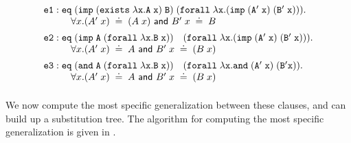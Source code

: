 \documentclass{llncs}
\newcommand{\andLF}{\tt{and}\;}
\newcommand{\impLF}{\tt{imp}\;}
\newcommand{\forallLF}{\tt{forall}\;}
\newcommand{\existsLF}{\tt{exists}\;}
\newcommand{\eqLF}{\tt{eq}\;}
\newcommand{\eqilLF}{\tt{e1}}
\newcommand{\eqirLF}{\tt{e2}}
\newcommand{\eqalLF}{\tt{e3}}
\newcommand{\unif}{\;\doteq\;}
\begin{document}
\begin{small}
\[
\begin{array}{ll}
\eqilLF: \eqLF (\impLF (\existsLF \lambda x. A\; x)\; B)\;
                 (\forallLF \lambda x. (\impLF (A'\; x)\; (B'\;x))). \\
\hspace{1cm}\forall x. (A'\; x) \unif (A \; x) {\textsf{ and } } B'\;x   \unif B\\[0.5em]
\eqirLF: \eqLF (\impLF A\; (\forallLF \lambda x. B\;x))\quad
                 (\forallLF \lambda x. (\impLF (A'\;x) \; (B'\; x))).\\
\hspace{1cm} \forall x. (A'\; x) \unif A  {\textsf{ and }} B'\;x   \unif (B\;x)\\[0.5em]
\eqalLF: \eqLF (\andLF A \; (\forallLF \lambda x. B\; x)) \quad
                 (\forallLF \lambda x. \andLF (A'\;x) \; (B' x)).\\
\hspace{1cm} \forall x. (A'\; x) \unif A  {\textsf{ and }} B'\;x   \unif (B\;x)\\[0.5em]
\end{array}
\]
\end{small}

We now compute the most specific
generalization between these clauses, and can build up a substitution
tree. The algorithm for computing the most specific generalization is
given in \cite{Pientka03phd,Pientka:ICLP03}.
\end{document}
